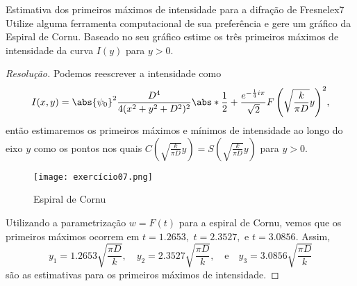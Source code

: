 \begin{exercício}{Estimativa dos primeiros máximos de intensidade para a difração de Fresnel}{ex7}
    Utilize alguma ferramenta computacional de sua preferência e gere um gráfico da Espiral de Cornu. Baseado no seu gráfico estime os três primeiros máximos de intensidade da curva \(I(y)\) para \(y > 0.\)
\end{exercício}
\begin{proof}[Resolução]
    Podemos reescrever a intensidade como
    \begin{equation*}
        I(x,y) = \abs{\psi_0}^2 \frac{D^4}{4(x^2 + y^2 + D^2)^2} \abs*{\frac12 + \frac{e^{-\frac14 i\pi}}{\sqrt{2}} F\left(\sqrt{\frac{k}{\pi D}} y\right)}^2,
    \end{equation*}
    então estimaremos os primeiros máximos e mínimos de intensidade ao longo do eixo \(y\) como os pontos nos quais \(C\left(\sqrt{\frac{k}{\pi D}} y\right) = S\left(\sqrt{\frac{k}{\pi D}} y\right)\) para \(y > 0\).
    \begin{figure}[h]
        \centering
        \texttt{[image: exercício07.png]}
        \caption{Espiral de Cornu}
    \end{figure}

    Utilizando a parametrização \(w = F(t)\) para a espiral de Cornu, vemos que os primeiros máximos ocorrem em \(t = 1.2653,\) \(t = 2.3527,\) e \(t = 3.0856.\) Assim, 
    \begin{equation*}
        y_1 = 1.2653\sqrt{\frac{\pi D}{k}},\quad
        y_2 = 2.3527\sqrt{\frac{\pi D}{k}},\quad\text{e}\quad
        y_3 = 3.0856\sqrt{\frac{\pi D}{k}}
    \end{equation*}
    são as estimativas para os primeiros máximos de intensidade.
\end{proof}
